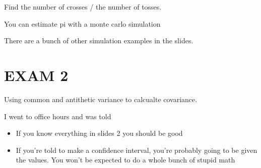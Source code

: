 \documentclass[fleqn]{report}
\begin{document}
Find the number of crosses / the number of tosses. 

You can estimate pi with a monte carlo simulation 

There are a bunch of other simulation examples in the slides. 

\section{EXAM 2}
Using common and antithetic variance to calcualte covariance. 

I went to office hours and was told 
\begin{itemize}
    \item 
    If you know everything in slides 2 you should be good 
    \item 
    If you're told to make a confidence interval, you're probably 
    going to be given the values. You won't be expected to do a whole 
    bunch of stupid math 
\end{itemize}
\end{document}
